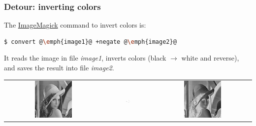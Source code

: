 \documentclass[english,serif,mathserif,xcolor=pdftex,dvipsnames,table]{beamer}
\begin{document}
\begin{frame}[fragile]
  \frametitle{Detour: inverting colors}
  The \href{http://www.imagemagick.org}{ImageMagick}
  command to invert colors is:
  \begin{lstlisting}[language=sh]
    $ convert @\emph{image1}@ +negate @\emph{image2}@
  \end{lstlisting}%

  \+
  It reads the image in file \emph{image1}, inverts colors (black
  $\to$ white and reverse), and saves the result into file
  \emph{image2}.

  \+
  \begin{tabular}[c]{ccc}
    \includegraphics[width=0.4\textwidth]{fig/lena_gray}
    &
    \includegraphics[width=0.1\textwidth]{fig/arrow}
    &
    \includegraphics[width=0.4\textwidth]{fig/lena_negative}
  \end{tabular}
\end{frame}
\end{document}
